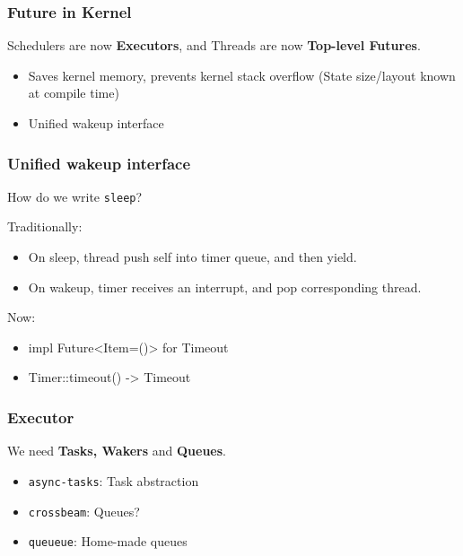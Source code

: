 \documentclass[UTF-8]{ctexbeamer}
\begin{document}
\begin{frame}
  \frametitle{Future in Kernel}

  Schedulers are now \textbf{Executors}, and Threads are now \textbf{Top-level Futures}.

  \pause
  \vspace{1em}

  \begin{itemize}
    \item Saves kernel memory, prevents kernel stack overflow (State size/layout known at compile time)
    \item Unified wakeup interface
  \end{itemize}
\end{frame}

\begin{frame}
  \frametitle{Unified wakeup interface}

  How do we write \texttt{sleep}?

  \pause
  \vspace{1em}

  Traditionally:
  
  \begin{itemize}
    \item On sleep, thread push self into timer queue, and then yield.
    \item On wakeup, timer receives an interrupt, and pop corresponding thread.
  \end{itemize}

  \pause
  \vspace{1em}

  Now:

  \begin{itemize}
    \item impl Future<Item=()> for Timeout
    \item Timer::timeout() -> Timeout
  \end{itemize}
\end{frame}

\begin{frame}
  \frametitle{Executor}

  We need \textbf{Tasks, Wakers} and \textbf{Queues}.

  \pause
  \vspace{1em}

  \begin{itemize}
    \item \texttt{async-tasks}: Task abstraction
    \item \texttt{crossbeam}: Queues?
    \item \texttt{queueue}: Home-made queues
  \end{itemize}

\end{frame}
\end{document}
